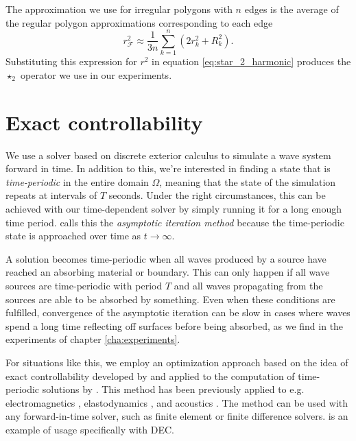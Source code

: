 \documentclass[utf8,english]{gradu3}
\begin{document}
The approximation we use for irregular polygons with $n$ edges is the average
of the regular polygon approximations corresponding to each edge
\begin{equation}\label{eq:polygon_approx_radius}
  r^2_{\mathcal{F}} \approx \frac{1}{3n} \sum_{k=1}^n (2r_k^2 + R_k^2).
\end{equation}
Substituting this expression for $r^2$ in equation \eqref{eq:star_2_harmonic}
produces the $\star_2$ operator we use in our experiments.


\chapter{Exact controllability}

We use a solver based on discrete exterior calculus to simulate
a wave system forward in time.
In addition to this, we're interested in finding a state that is
\textit{time-periodic} in the entire domain $\Omega$,
meaning that the state of the simulation repeats at intervals of $T$ seconds.
Under the right circumstances, this can be achieved with our time-dependent solver
by simply running it for a long enough time period.
\parencite{rabina_numerical_2014} calls this the \textit{asymptotic iteration method}
because the time-periodic state is approached over time as $t \rightarrow \infty$.

A solution becomes time-periodic when all waves produced by a source
have reached an absorbing material or boundary.
This can only happen if all wave sources are time-periodic with period $T$
and all waves propagating from the sources are able to be absorbed by something.
Even when these conditions are fulfilled,
convergence of the asymptotic iteration can be slow in cases
where waves spend a long time reflecting off surfaces before being absorbed,
as we find in the experiments of chapter \ref{cha:experiments}.

For situations like this, we employ an optimization approach
based on the idea of exact controllability developed by \textcite{lions_exact_1988}
and applied to the computation of time-periodic solutions by
\textcite{bristeau_controllability_1998}.
This method has been previously applied to e.g.
electromagnetics \parencite{rabina_numerical_2014},
elastodynamics \parencite{monkola_time-harmonic_2008},
and acoustics \parencite{kahkonen_solution_2011}.
The method can be used with any forward-in-time solver,
such as finite element or finite difference solvers.
\parencite{rabina_numerical_2014} is an example of usage specifically with DEC.
\end{document}
